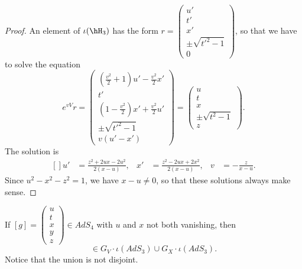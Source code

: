 	\begin{proof}
		An element of $\iota(\hH_3)$ has the form
		$r=\begin{pmatrix}
				u'               \\
				t'               \\
				x'               \\
				\pm\sqrt{t'^2-1} \\
				0
			\end{pmatrix}$,
		so that we have to solve the equation
		\begin{equation}
			e^{vV}r=\begin{pmatrix}
				\left( \frac{ v^2 }{ 2 }+1 \right)u'-\frac{ v^2 }{ 2 }x' \\
				t'                                                       \\
				\left( 1-\frac{ v^2 }{ 2 } \right)x'+\frac{ v^2 }{ 2 }u' \\
				\pm\sqrt{t'^2-1}                                         \\
				v(u'-x')
			\end{pmatrix}
			=
			\begin{pmatrix}
				u               \\
				t               \\
				x               \\
				\pm\sqrt{t^2-1} \\
				z
			\end{pmatrix}.
		\end{equation}
		The solution is
		\begin{equation}
			\begin{aligned}[]
				u' & =\frac{ z^2+2ux-2u^2 }{ 2(x-u) }, & x' & =\frac{ z^2-2ux+2x^2 }{ 2(x-u) }, & v & =-\frac{ z }{ x-u }.
			\end{aligned}
		\end{equation}
		Since $u^2-x^2-z^2=1$, we have $x-u\neq 0$, so that these solutions always make sense.
	\end{proof}

	\begin{lemma}
		If $[g]=\begin{pmatrix}
				u \\
				t \\
				x \\
				y \\
				z
			\end{pmatrix}\in AdS_4$ with $u$ and $x$ not both vanishing, then
		\begin{equation}
			[g]\in G_V\cdot\iota(AdS_3)\cup G_X\cdot \iota(AdS_3).
		\end{equation}
		Notice that the union is not disjoint.
	\end{lemma}

